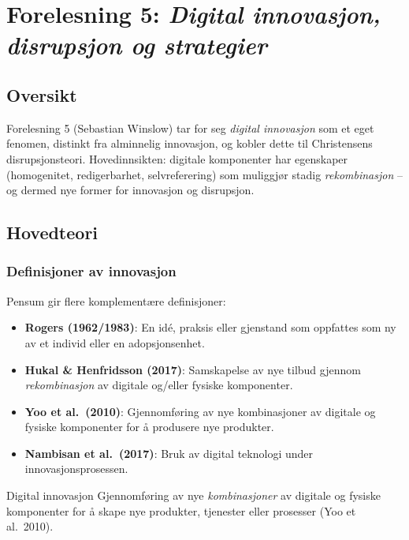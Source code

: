 \section{Forelesning 5: \emph{Digital innovasjon, disrupsjon og strategier}}
\label{sec:lec05}

\subsection*{Oversikt}
Forelesning 5 (Sebastian Winslow) tar for seg \emph{digital innovasjon} som et
eget fenomen, distinkt fra alminnelig innovasjon, og kobler dette til
Christensens disrupsjonsteori. Hovedinnsikten: digitale komponenter har
egenskaper (homogenitet, redigerbarhet, selvreferering) som muliggjør stadig
\emph{rekombinasjon} -- og dermed nye former for innovasjon og disrupsjon.

\subsection{Hovedteori}

\subsubsection*{Definisjoner av innovasjon}
Pensum gir flere komplementære definisjoner:
\begin{itemize}
  \item \textbf{Rogers (1962/1983)}: \guillemotleft{}En idé, praksis eller gjenstand som
    oppfattes som ny av et individ eller en adopsjonsenhet.\guillemotright{}
  \item \textbf{Hukal \& Henfridsson (2017)}: \guillemotleft{}Samskapelse av nye tilbud
    gjennom \emph{rekombinasjon} av digitale og/eller fysiske komponenter.\guillemotright{}
  \item \textbf{Yoo et al.\ (2010)}: \guillemotleft{}Gjennomføring av nye kombinasjoner av
    digitale og fysiske komponenter for å produsere nye produkter.\guillemotright{}
  \item \textbf{Nambisan et al.\ (2017)}: \guillemotleft{}Bruk av digital teknologi under
    innovasjonsprosessen.\guillemotright{}
\end{itemize}

\begin{definition}{Digital innovasjon}
Gjennomføring av nye \emph{kombinasjoner} av digitale og fysiske komponenter
for å skape nye produkter, tjenester eller prosesser (Yoo et al.\ 2010).
\end{definition}

